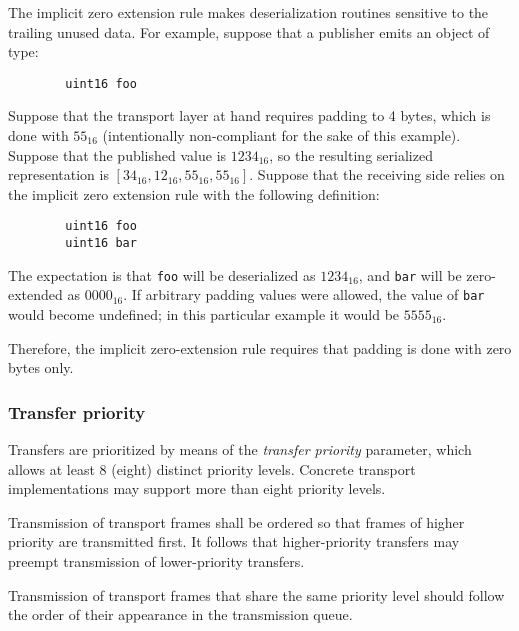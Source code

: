 \begin{remark}[breakable]
    The implicit zero extension rule makes deserialization routines sensitive to the trailing unused data.
    For example, suppose that a publisher emits an object of type:

    \begin{verbatim}
        uint16 foo
    \end{verbatim}

    Suppose that the transport layer at hand requires padding to 4 bytes, which is done with $55_{16}$
    (intentionally non-compliant for the sake of this example).
    Suppose that the published value is $1234_{16}$,
    so the resulting serialized representation is $\left[34_{16}, 12_{16}, 55_{16}, 55_{16}\right]$.
    Suppose that the receiving side relies on the implicit zero extension rule with the following definition:

    \begin{verbatim}
        uint16 foo
        uint16 bar
    \end{verbatim}

    The expectation is that \verb|foo| will be deserialized as $1234_{16}$,
    and \verb|bar| will be zero-extended as $0000_{16}$.
    If arbitrary padding values were allowed, the value of \verb|bar| would become undefined;
    in this particular example it would be $5555_{16}$.

    Therefore, the implicit zero-extension rule requires that padding is done with zero bytes only.
\end{remark}

\subsubsection{Transfer priority}\label{sec:transport_transfer_priority}

Transfers are prioritized by means of the \emph{transfer priority} parameter,
which allows at least 8 (eight) distinct priority levels.
Concrete transport implementations may support more than eight priority levels.

Transmission of transport frames shall be ordered so that frames of higher priority are transmitted first.
It follows that higher-priority transfers may preempt transmission of lower-priority transfers.

Transmission of transport frames that share the same priority level should follow the order of their appearance in
the transmission queue.

